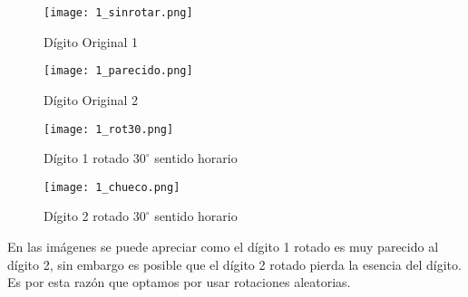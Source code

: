 \begin{figure}[ht] 
  \begin{minipage}[b]{0.5\linewidth}
    \centering
    \texttt{[image: 1\_sinrotar.png]} 
    \caption{Dígito Original 1} 
    \vspace{4ex}
  \end{minipage}%
  \begin{minipage}[b]{0.5\linewidth}
    \centering
    \texttt{[image: 1\_parecido.png]} 
    \caption{Dígito Original 2} 
    \vspace{4ex}
  \end{minipage} 
  \begin{minipage}[b]{0.5\linewidth}
    \centering
    \texttt{[image: 1\_rot30.png]} 
    \caption{Dígito 1 rotado $30^\circ$ sentido horario} 
    \vspace{4ex}
  \end{minipage}%
  \begin{minipage}[b]{0.5\linewidth}
    \centering
    \texttt{[image: 1\_chueco.png]} 
    \caption{Dígito 2 rotado $30^\circ$ sentido horario} 
    \vspace{4ex}
  \end{minipage} 
\end{figure}

En las imágenes se puede apreciar como el dígito 1 rotado es muy parecido al dígito 2, sin embargo es posible que el dígito 2 rotado pierda la esencia del dígito. Es por esta razón que optamos por usar rotaciones aleatorias.